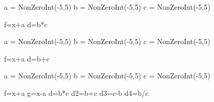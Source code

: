 \begin{sagesilent}
a = NonZeroInt(-5,5)
b = NonZeroInt(-5,5)
c = NonZeroInt(-5,5)

f=x+a
d=b*c
\end{sagesilent}


\begin{sagesilent}
a = NonZeroInt(-5,5)
b = NonZeroInt(-5,5)
c = NonZeroInt(-5,5)

f=x+a
d=b+c
\end{sagesilent}


\begin{sagesilent}
a = NonZeroInt(-5,5)
b = NonZeroInt(-5,5)
c = NonZeroInt(-5,5)

f=x+a
g=x-a
d=b*c
d2=b+c
d3=c-b
d4=b/c

\end{sagesilent}

